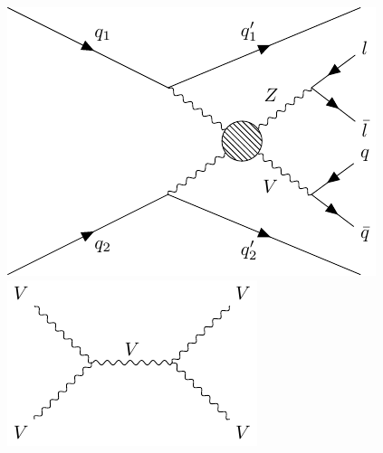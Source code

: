 \begin{figure}[!ht]
  \centering
  \begin{minipage}{0.45\textwidth}
    \includegraphics[width=\textwidth]{figures/feyn_vbs_0.pdf}
    \vspace{5pt}
  \end{minipage}
  \begin{minipage}{0.23\textwidth}
    \includegraphics[width=\textwidth]{figures/feyn_vbs_2.pdf}
  \end{minipage}%
  \begin{minipage}{0.18\textwidth}

\end{minipage}
\end{figure}
